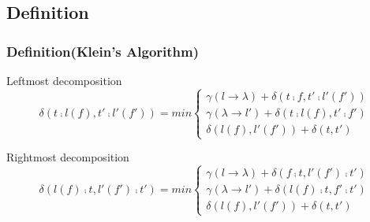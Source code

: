 \documentclass{beamer}
\begin{document}
\subsection{Definition}
\begin{frame}
\frametitle{Definition(Klein's Algorithm)}
\begin{block}{Leftmost decomposition}
\begin{displaymath}
\delta(t \comp l(f), t' \comp l'(f')) = min \begin{cases}
		\gamma(l \to \lambda) + \delta(t \comp f, t' \comp l'(f'))  \\%
        \gamma(\lambda \to l') + \delta(t \comp l(f), t' \comp f') \\%
        \delta(l(f), l'(f')) + \delta(t, t') %
								\end{cases}
\end{displaymath}
\end{block}
\begin{block}{Rightmost decomposition}
\begin{displaymath}
\delta(l(f) \comp t, l'(f') \comp t') = min \begin{cases}
		\gamma(l \to \lambda) + \delta(f \comp t, l'(f') \comp t')  \\%
        \gamma(\lambda \to l') + \delta(l(f) \comp t, f' \comp t') \\%
        \delta(l(f), l'(f')) + \delta(t, t') %
								\end{cases}
\end{displaymath}
\end{block}
\end{frame}

\end{document}
